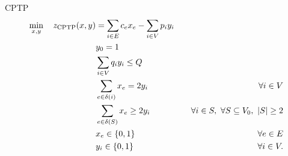 \begin{frame}{CPTP}
	\begin{align}
		\min_{x,y} \quad z_\mt{CPTP}(x, y) & = \ExprCptpObjValDef                     & \label{eq:cptp-obj-function}                                                                          \\
		                                   & y_0 = 1                                  & \label{eq:cptp-depot-part-of-tour-constraint}                                                         \\
		                                   & \ExprCptpDemandSum  \le Q                & \label{eq:cptp-resource-upper-bound-constraint}                                                       \\
		                                   & \ExprCptpEdgesIncident{i}  = 2 y_i       & \quad \forall i \in V         \label{eq:cptp-flow-conservation-constraint}                            \\
		                                   & \ExprCptpFlowExiting{S} \ge 2 y_{i}      & \quad \forall i \in S,\ \forall S \subseteq V_0,\ \SetSize*{S} \ge 2 \label{eq:cptp-gsec-constraints} \\
		                                   & x_{e}                   \in \Set*{0, 1}  & \quad \forall e \in E               \label{eq:cptp-x-mip-var-bounds}                                  \\
		                                   & y_{i}                    \in \Set*{0, 1} & \quad \forall i \in V             \label{eq:cptp-y-mip-var-bounds}.
	\end{align}
\end{frame}
